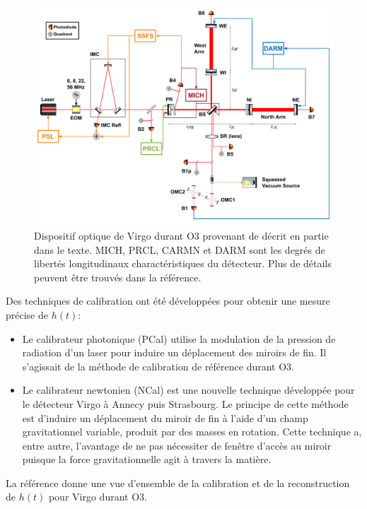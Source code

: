 %
\begin{figure}[H]
  \centering
  \includegraphics[width=\linewidth]{sectionDetection/virgo_layout.png}
  \caption{Dispositif optique de Virgo durant O3 provenant de \cite{virgo_layout} décrit en partie dans le texte. MICH, PRCL, CARMN et DARM sont les degrés de libertés longitudinaux charactéristiques du détecteur. Plus de détails peuvent être trouvés dans la référence.}
  \label{fig:virgo_layout}
\end{figure}
%

Des techniques de calibration ont été développées pour obtenir une mesure précise de $h(t)$:
\begin{itemize}
\item Le calibrateur photonique \cite{pcal} (PCal) utilise la modulation de la pression de radiation d'un laser pour induire un déplacement des miroirs de fin.
  Il s'agissait de la méthode de calibration de référence durant O3.
\item Le calibrateur newtonien \cite{ncal1,ncal2} (NCal) est une nouvelle technique développée pour le détecteur Virgo à Annecy puis Strasbourg.
  Le principe de cette méthode est d'induire un déplacement du miroir de fin à l'aide d'un champ gravitationnel variable, produit par des masses en rotation.
  Cette technique a, entre autre, l'avantage de ne pas nécessiter de fenêtre d'accès au miroir puisque la force gravitationnelle agit à travers la matière.
\end{itemize}
La référence \cite{strain_reconstruction} donne une vue d'ensemble de la calibration et de la reconstruction de $h(t)$ pour Virgo durant O3.


